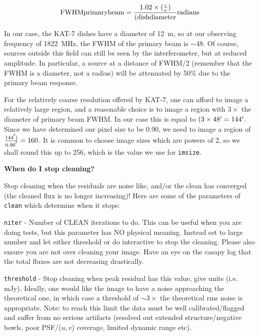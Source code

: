 \documentclass[force,almostfull,justified]{tufte-book}
\begin{document}
\begin{equation}
{\rm FWHM primary beam}  =\frac{1.02\times(\frac{c}{\nu})}{(\rm dish diameter} {\rm radians}
\end{equation}

In our case, the KAT-7 dishes have a diameter of 12~m, so at our observing frequency of 1822~MHz, the
FWHM of the primary beam is $\sim$48\arcmin.  Of course, sources outside this field can still be seen
by the interferometer, but at reduced amplitude.  In particular, a source at a distance of FWHM/2
(remember that the FWHM is a diameter, not a radius) will be attenuated by 50\% due to the primary
beam response.

For the relatively coarse resolution offered by KAT-7, one can afford to image a relatively large
region, and a reasonable choice is to image a region with $3\times$ the diameter of primary beam FWHM.
In our case this is equal to $(3 \times 48\mbox{$^\prime$} = 144\mbox{$^\prime$}$.  Since we have determined our pixel
size to be 0.90\arcmin, we need to image a region of $\frac{144\mbox{$^\prime$})}{0.90\mbox{$^\prime$}} = 160$.  It is
common to choose image sizes which are powers of 2, so we shall round this up to 256, which is the
value we use for {\tt imsize}.

\bigskip
\textbf{When do I stop cleaning? }

Stop cleaning when the residuals are noise like, and/or the clean has converged (the cleaned flux is
no longer increasing)!  Here are some of the parameters of {\tt clean} which determine when it stops:

{\tt niter} - Number of CLEAN iterations to do. This can be useful when you are doing tests, but this
parameter has NO physical meaning. Instead set to large number and let either threshold or do
interactive to stop the cleaning. Please also ensure you are not over cleaning your image.  Have an
eye on the casapy log that the total fluxes are not decreasing drastically.

{\tt threshold} - Stop cleaning when peak residual has this value, give units (i.e. mJy). Ideally, one
would like the image to have a noise approaching the theoretical one, in which case a threshold of
$\sim 3\times$ the theoretical rms noise is appropriate.  Note: to reach this limit the data must be
well calibrated/flagged and suffer from no serious artifacts (resolved out extended structure/negative
bowls, poor PSF/($u,v$) coverage, limited dynamic range etc).
\end{document}
